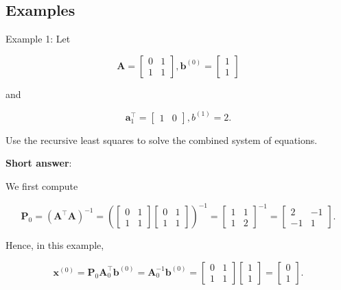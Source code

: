 \subsection{Examples}
Example 1: Let

\[
	\boldsymbol{A}=\left[\begin{array}{ll}
		0 & 1 \\
		1 & 1
	\end{array}\right], \boldsymbol{b}^{(0)}=\left[\begin{array}{l}
		1 \\
		1
	\end{array}\right]
\]

and

\[
	\boldsymbol{a}_{1}^{\top}=\left[\begin{array}{ll}
		1 & 0
	\end{array}\right], b^{(1)}=2 .
\]

Use the recursive least squares to solve the combined system of equations.

\textbf{Short answer}:

We first compute

\[
	\boldsymbol{P}_{0}=\left(\boldsymbol{A}^{\top} \boldsymbol{A}\right)^{-1}=\left(\left[\begin{array}{ll}
		0 & 1 \\
		1 & 1
	\end{array}\right]\left[\begin{array}{ll}
		0 & 1 \\
		1 & 1
	\end{array}\right]\right)^{-1}=\left[\begin{array}{ll}
		1 & 1 \\
		1 & 2
	\end{array}\right]^{-1}=\left[\begin{array}{cc}
		2 & -1 \\
		-1 & 1
	\end{array}\right] .
\]

Hence, in this example,

\[
	\boldsymbol{x}^{(0)}=\boldsymbol{P}_{0} \boldsymbol{A}_{0}^{\top} \boldsymbol{b}^{(0)}=\boldsymbol{A}_{0}^{-1} \boldsymbol{b}^{(0)}=\left[\begin{array}{ll}
		0 & 1 \\
		1 & 1
	\end{array}\right]\left[\begin{array}{l}
		1 \\
		1
	\end{array}\right]=\left[\begin{array}{l}
		0 \\
		1
	\end{array}\right] .
\]

